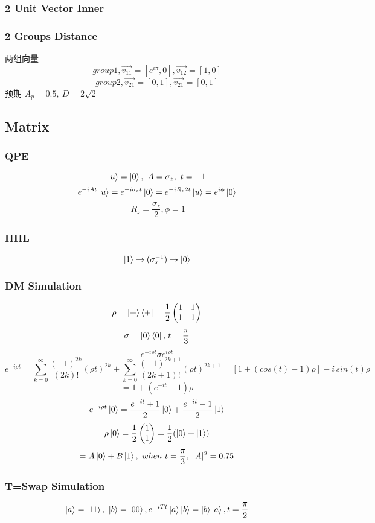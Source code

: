 \documentclass{article}
\begin{document}
\subsubsection{2 Unit Vector Inner}
\subsubsection{2 Groups Distance}
	两组向量
	$$ group 1 , \vec{v_{11}} =[e^{i\pi},0], \vec{v_{12}} =[1,0] $$
	$$ group 2 , \vec{v_{21}} =[0,1], \vec{v_{21}} =[0,1] $$
	预期 $ A_p = 0.5, \ D = 2\sqrt{2} $
\subsection{Matrix}
\subsubsection{QPE}
	$$ \ket{u} = \ket{0}, \  A=\sigma_z, \ t= -1 $$
	$$ e^{-iAt} \ket{u} = e^{-i \sigma_z t} \ket{0} = e^{-iR_z 2t} \ket{u} = e^{i \phi} \ket{0}$$
	$$ \ R_z = \frac{\sigma_z}{2}, \phi =1 $$
\subsubsection{HHL}
	$$ \ket{1} \rightarrow(\sigma_x^{-1}) \rightarrow \ket{0} $$
\subsubsection{DM Simulation}
	$$ \rho = \ket{+} \bra{+}  = \frac{1}{2} \left( \begin{matrix}
	1 & 1 \\
	1 & 1\\
\end{matrix} \right)	 $$
	$$ \sigma = \ket{0}\bra{0}, \, t=\frac{\pi}{3} $$
	$$ e^{-i \rho t} \sigma e^{i \rho t} $$
	$$ e^{-i \rho t} = \sum_{k=0}^{\infty} { \frac{(-1)^{2k}}{(2k)!} (\rho t) ^{2k} } +\sum_{k=0}^{\infty} { \frac{(-1)^{2k+1}}{(2k+1)!} (\rho t) ^{2k+1} } = [1+ (cos(t)-1)\rho]  - i\,sin(t) \rho $$
$$= 1+(e^{-it}-1)\rho$$
	$$ e^{-i \rho t} \ket{0} = \frac{e^{-it}+1}{2}\ket{0} + \frac{e^{-it}-1}{2}\ket{1} $$ $$ \rho \ket{0} = \frac{1}{2} \begin{pmatrix}
	1 \\ 1
	\end{pmatrix} = \frac{1}{2} (\ket{0} +\ket{1}) $$
	$$ =A\ket{0}+B\ket{1}, \ when \ t=\frac{\pi}{3}, \ |A|^2 =0.75 $$
\subsubsection{T=Swap Simulation}
	$$ \ket{a}=\ket{11},\ \ket{b}=\ket{00}, e^{-iTt}\ket{a}\ket{b} = \ket{b}\ket{a}, t=\frac{\pi}{2} $$
\end{document}
